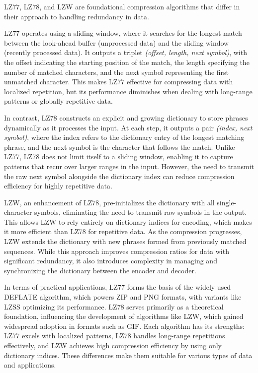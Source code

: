 LZ77, LZ78, and LZW are foundational compression algorithms that differ in their approach to handling redundancy in data. 

\vspace{10pt}

LZ77 operates using a sliding window, where it searches for the longest match between the look-ahead buffer (unprocessed data) and the sliding window (recently processed data). It outputs a triplet \textit{(offset, length, next symbol)}, with the offset indicating the starting position of the match, the length specifying the number of matched characters, and the next symbol representing the first unmatched character. This makes LZ77 effective for compressing data with localized repetition, but its performance diminishes when dealing with long-range patterns or globally repetitive data.

\vspace{10pt}

In contrast, LZ78 constructs an explicit and growing dictionary to store phrases dynamically as it processes the input. At each step, it outputs a pair \textit{(index, next symbol)}, where the index refers to the dictionary entry of the longest matching phrase, and the next symbol is the character that follows the match. Unlike LZ77, LZ78 does not limit itself to a sliding window, enabling it to capture patterns that recur over larger ranges in the input. However, the need to transmit the raw next symbol alongside the dictionary index can reduce compression efficiency for highly repetitive data.

\vspace{10pt}

LZW, an enhancement of LZ78, pre-initializes the dictionary with all single-character symbols, eliminating the need to transmit raw symbols in the output. This allows LZW to rely entirely on dictionary indices for encoding, which makes it more efficient than LZ78 for repetitive data. As the compression progresses, LZW extends the dictionary with new phrases formed from previously matched sequences. While this approach improves compression ratios for data with significant redundancy, it also introduces complexity in managing and synchronizing the dictionary between the encoder and decoder.

\vspace{10pt}

In terms of practical applications, LZ77 forms the basis of the widely used DEFLATE algorithm, which powers ZIP and PNG formats, with variants like LZSS optimizing its performance. LZ78 serves primarily as a theoretical foundation, influencing the development of algorithms like LZW, which gained widespread adoption in formats such as GIF. Each algorithm has its strengths: LZ77 excels with localized patterns, LZ78 handles long-range repetitions effectively, and LZW achieves high compression efficiency by using only dictionary indices. These differences make them suitable for various types of data and applications. 

